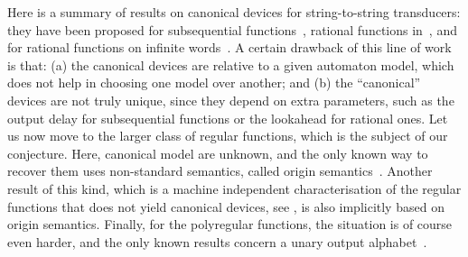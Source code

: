 Here is a summary of results on canonical devices for string-to-string
transducers: they have been proposed for subsequential functions~\cite[Théorème
1.1]{choffrut1977}, rational functions in~\cite[Theorem
1]{reutenauerSchutzenberger1991},  and for rational functions on infinite
words~\cite[Section 4]{canonicalRational2018}. A certain drawback of this line
of work is that: (a) the canonical devices are relative to a given automaton
model, which does not help in choosing one model over another; and (b) the
``canonical'' devices are not truly unique, since they depend on extra
parameters, such as the output delay for subsequential functions or the
lookahead for rational ones. Let us now move to the larger class of regular
functions, which is the subject of our conjecture. Here,  canonical model are
unknown, and the only known way to recover them uses non-standard semantics,
called origin semantics~\cite[Theorem
1]{bojanczykTransducersOriginInformation2014}. Another result of this kind,
which is a machine independent characterisation of the regular functions that
does not yield canonical devices, see \cite[Theorem
3.2]{bojanczykTitoRegular23}, is also implicitly based on origin semantics.
Finally, for the polyregular functions, the situation is of course even harder,
and the only known results concern a unary output alphabet~\cite[Section
IV]{Zpolyreg23}.


